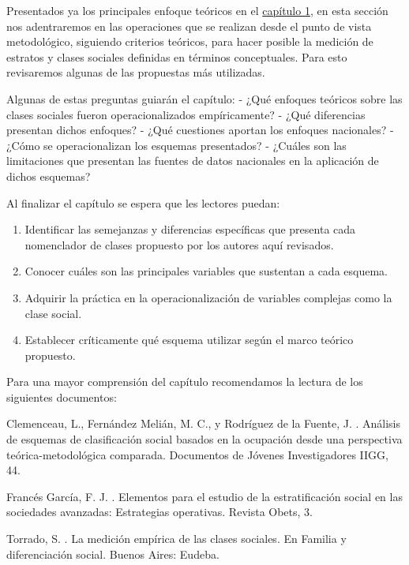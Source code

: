 \documentclass[
]{book}
\providecommand{\tightlist}{%
  \setlength{\itemsep}{0pt}\setlength{\parskip}{0pt}}
\begin{document}
Presentados ya los principales enfoque teóricos en el \protect\hyperlink{estructura1}{capítulo 1}, en esta sección nos adentraremos en las operaciones que se realizan desde el punto de vista metodológico, siguiendo criterios teóricos, para hacer posible la medición de estratos y clases sociales definidas en términos conceptuales. Para esto revisaremos algunas de las propuestas más utilizadas.

Algunas de estas preguntas guiarán el capítulo:
- ¿Qué enfoques teóricos sobre las clases sociales fueron operacionalizados empíricamente?
- ¿Qué diferencias presentan dichos enfoques?
- ¿Qué cuestiones aportan los enfoques nacionales?
- ¿Cómo se operacionalizan los esquemas presentados?
- ¿Cuáles son las limitaciones que presentan las fuentes de datos nacionales en la aplicación de dichos esquemas?

Al finalizar el capítulo se espera que les lectores puedan:

\begin{enumerate}
\def\labelenumi{\arabic{enumi}.}
\tightlist
\item
  Identificar las semejanzas y diferencias específicas que presenta cada nomenclador de clases propuesto por los autores aquí revisados.
\item
  Conocer cuáles son las principales variables que sustentan a cada esquema.
\item
  Adquirir la práctica en la operacionalización de variables complejas como la clase social.
\item
  Establecer críticamente qué esquema utilizar según el marco teórico propuesto.
\end{enumerate}

Para una mayor comprensión del capítulo recomendamos la lectura de los siguientes documentos:

Clemenceau, L., Fernández Melián, M. C., y Rodríguez de la Fuente, J. \citeyearpar{Clemenceau.etal2016}. Análisis de esquemas de clasificación social basados en la ocupación desde una perspectiva teórica-metodológica comparada. Documentos de Jóvenes Investigadores IIGG, 44.

Francés García, F. J. \citeyearpar{FrancesGarcia2009}. Elementos para el estudio de la estratificación social en las sociedades avanzadas: Estrategias operativas. Revista Obets, 3.

Torrado, S. \citeyearpar{Torrado1998d}. La medición empírica de las clases sociales. En Familia y diferenciación social. Buenos Aires: Eudeba.
\end{document}
